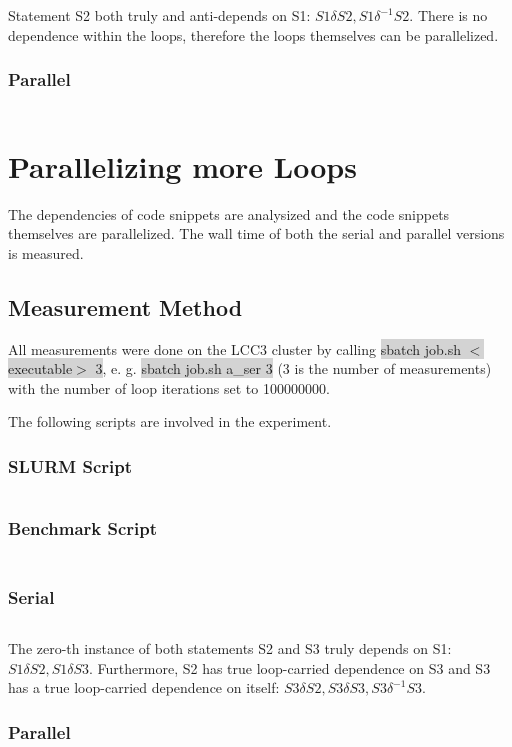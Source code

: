 \documentclass[parskip]{scrartcl}
\begin{document}
	Statement S2 both truly and anti-depends on S1: $S1\delta S2, S1\delta^{-1} S2$. There is no dependence within the loops, therefore the loops themselves can be parallelized.
	\subsubsection{Parallel}
	\inputminted	[linenos]{c}{ex1/c_par.c}
	
	\section{Parallelizing more Loops}
	The dependencies of code snippets are analysized and the code snippets themselves are parallelized. The wall time of both the serial and parallel versions is measured.
	
	\subsection{Measurement Method}
	All measurements were done on the LCC3 cluster by calling \colorbox{lightgray}{sbatch job.sh $<$executable$>$ 3}, e. g. \colorbox{lightgray}{sbatch job.sh a\_ser 3} (3 is the number of measurements) with the number of loop iterations set to 100000000.
	
	The following scripts are involved in the experiment.
	\subsubsection{SLURM Script}
	\inputminted[linenos]{bash}{ex2/job.sh}
	\subsubsection{Benchmark Script}
	\inputminted[linenos]{bash}{ex2/benchmark.sh}
	\subsection{}
	\subsubsection{Serial}
	\inputminted	[linenos]{c}{ex2/a_ser.h}
	
	The zero-th instance of both statements S2 and S3 truly depends on S1: $S1\delta S2, S1\delta S3$. Furthermore, S2 has true loop-carried dependence on S3 and S3 has a true loop-carried dependence on itself: $S3\delta S2, S3\delta S3, S3\delta^{-1} S3$.
	\subsubsection{Parallel}
	\inputminted	[linenos]{c}{ex2/a_par.h}
	
\end{document}
